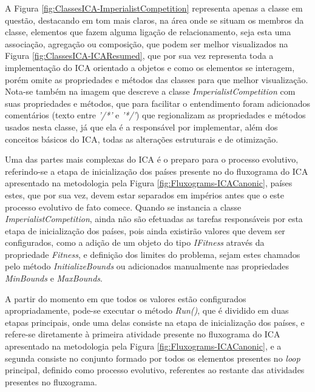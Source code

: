 A Figura \ref{fig:ClassesICA-ImperialistCompetition} representa apenas a classe em questão, destacando em tom mais claros, na área onde se situam os membros da classe, elementos que fazem alguma ligação de relacionamento, seja esta uma associação, agregação ou composição, que podem ser melhor visualizados na Figura \ref{fig:ClassesICA-ICAResumed}, que por sua vez representa toda a implementação do ICA orientado a objetos e como os elementos se interagem, porém omite as propriedades e métodos das classes para que melhor visualização. Nota-se também na imagem que descreve a classe \emph{ImperialistCompetition} com suas propriedades e métodos, que para facilitar o entendimento foram adicionados comentários (texto entre \emph{'/*'} e \emph{'*/'}) que regionalizam as propriedades e métodos usados nesta classe, já que ela é a responsável por implementar, além dos conceitos básicos do ICA, todas as alterações estruturais e de otimização.


Uma das partes mais complexas do ICA é o preparo para o processo evolutivo, referindo-se a etapa de inicialização dos países presente no do fluxograma do ICA apresentado na metodologia pela Figura \ref{fig:Fluxograms-ICACanonic}, países estes, que por sua vez, devem estar separados em impérios antes que o este processo evolutivo de fato comece. Quando se instancia a classe \emph{ImperialistCompetition}, ainda não são efetuadas as tarefas responsáveis por esta etapa de inicialização dos países, pois ainda existirão valores que devem ser configurados, como a adição de um objeto do tipo \emph{IFitness} através da propriedade \emph{Fitness}, e definição dos limites do problema, sejam estes chamados pelo método \emph{InitializeBounds} ou adicionados manualmente nas propriedades \emph{MinBounds} e \emph{MaxBounds}.

A partir do momento em que todos os valores estão configurados apropriadamente, pode-se executar o método \emph{Run()}, que é dividido em duas etapas principais, onde uma delas consiste na etapa de inicialização dos países, e refere-se diretamente à primeira atividade presente no fluxograma do ICA apresentado na metodologia pela Figura \ref{fig:Fluxograms-ICACanonic}, e a segunda consiste no conjunto formado por todos os elementos presentes no \emph{loop} principal, definido como processo evolutivo, referentes ao restante das atividades presentes no fluxograma.


